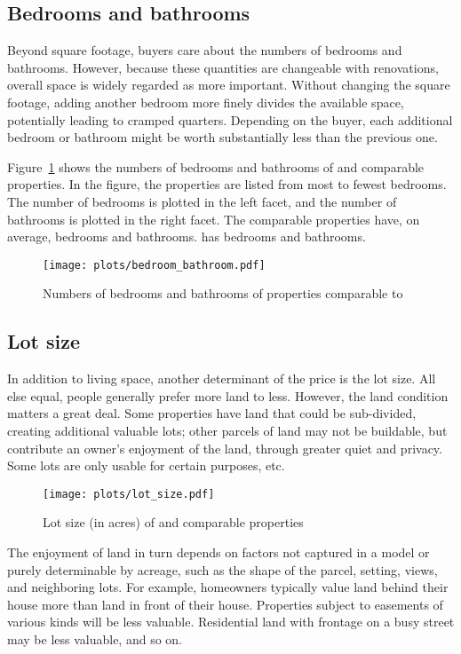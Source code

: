 \documentclass[
12pt, %
letterpaper, %
oneside, %
headinclude,footinclude, %
BCOR5mm, %
]{scrartcl}
\begin{document}
\subsection{Bedrooms and bathrooms}
Beyond square footage, buyers care about the numbers of bedrooms and bathrooms.
However, because these quantities are changeable with renovations, overall space is widely regarded as more important.
Without changing the square footage, adding another bedroom more finely divides the available space, potentially leading to cramped quarters. 
Depending on the buyer, each additional bedroom or bathroom might be worth substantially less than the previous one.

Figure~\ref{fig:bedroom_bathroom} shows the numbers of bedrooms and bathrooms of \PropertyName{} and comparable properties. 
In the figure, the properties are listed from most to fewest bedrooms.
The number of bedrooms is plotted in the left facet, and the number of bathrooms is plotted in the right facet. 
The comparable properties have, on average, \AverageBedrooms{} bedrooms and \AverageBaths{} bathrooms.
\PropertyName{} has bedrooms \NumberOfBedrooms{} and \NumberOfBaths{} bathrooms.

\begin{figure}[!]
\centering
\caption{Numbers of bedrooms and bathrooms of properties comparable to \PropertyName{}} \label{fig:bedroom_bathroom}  
\texttt{[image: plots/bedroom\_bathroom.pdf]} 
\end{figure}

\subsection{Lot size}
In addition to living space, another determinant of the price is the lot size.
All else equal, people generally prefer more land to less.
However, the land condition matters a great deal. Some properties have land that could be sub-divided, creating additional valuable lots; other parcels of land may not be buildable, but contribute an owner’s enjoyment of the land, through greater quiet
and privacy. Some lots are only usable for certain purposes, etc.

\begin{figure}[!]
\centering
\caption{Lot size (in acres) of \PropertyName{} and comparable properties} \label{fig:lot_size}  
\texttt{[image: plots/lot\_size.pdf]} 
\end{figure}

The enjoyment of land in turn depends on factors not captured in a model or purely determinable by acreage, such as the shape of the parcel, setting, views, and neighboring lots.
For example, homeowners typically value land behind their house more than land in front of their house. 
Properties subject to easements of various kinds will be less valuable.
Residential land with frontage on a busy street may be less valuable, and so on.
\end{document}
